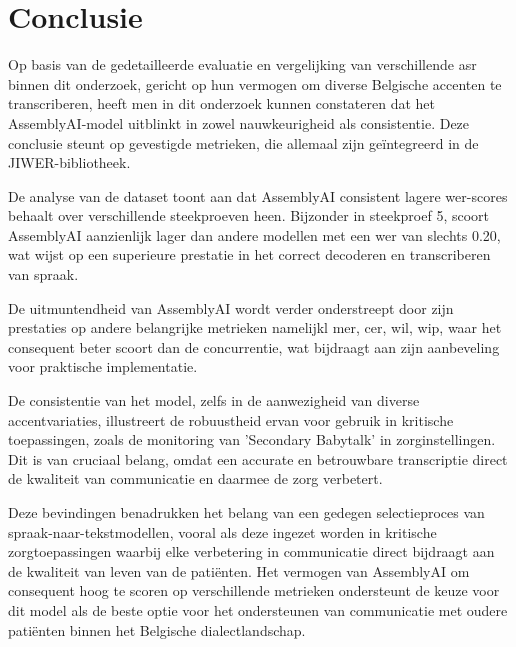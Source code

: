 
\chapter{Conclusie}%
\label{ch:conclusie}



Op basis van de gedetailleerde evaluatie en vergelijking van verschillende \gls{asr} binnen dit onderzoek, gericht op hun vermogen om diverse Belgische accenten te transcriberen, heeft men in dit onderzoek kunnen constateren dat het AssemblyAI-model uitblinkt in zowel nauwkeurigheid als consistentie. Deze conclusie steunt op gevestigde metrieken, die allemaal zijn geïntegreerd in de JIWER-bibliotheek.

De analyse van de dataset toont aan dat AssemblyAI consistent lagere \gls{wer}-scores behaalt over verschillende steekproeven heen. Bijzonder in steekproef 5, scoort AssemblyAI aanzienlijk lager dan andere modellen met een \gls{wer} van slechts 0.20, wat wijst op een superieure prestatie in het correct decoderen en transcriberen van spraak.

De uitmuntendheid van AssemblyAI wordt verder onderstreept door zijn prestaties op andere belangrijke metrieken namelijkl \gls{mer}, \gls{cer}, \gls{wil}, \gls{wip}, waar het consequent beter scoort dan de concurrentie, wat bijdraagt aan zijn aanbeveling voor praktische implementatie.

De consistentie van het model, zelfs in de aanwezigheid van diverse accentvariaties, illustreert de robuustheid ervan voor gebruik in kritische toepassingen, zoals de monitoring van 'Secondary Babytalk' in zorginstellingen. Dit is van cruciaal belang, omdat een accurate en betrouwbare transcriptie direct de kwaliteit van communicatie en daarmee de zorg verbetert.

Deze bevindingen benadrukken het belang van een gedegen selectieproces van spraak-naar-tekstmodellen, vooral als deze ingezet worden in kritische zorgtoepassingen waarbij elke verbetering in communicatie direct bijdraagt aan de kwaliteit van leven van de patiënten. Het vermogen van AssemblyAI om consequent hoog te scoren op verschillende metrieken ondersteunt de keuze voor dit model als de beste optie voor het ondersteunen van communicatie met oudere patiënten binnen het Belgische dialectlandschap. 
